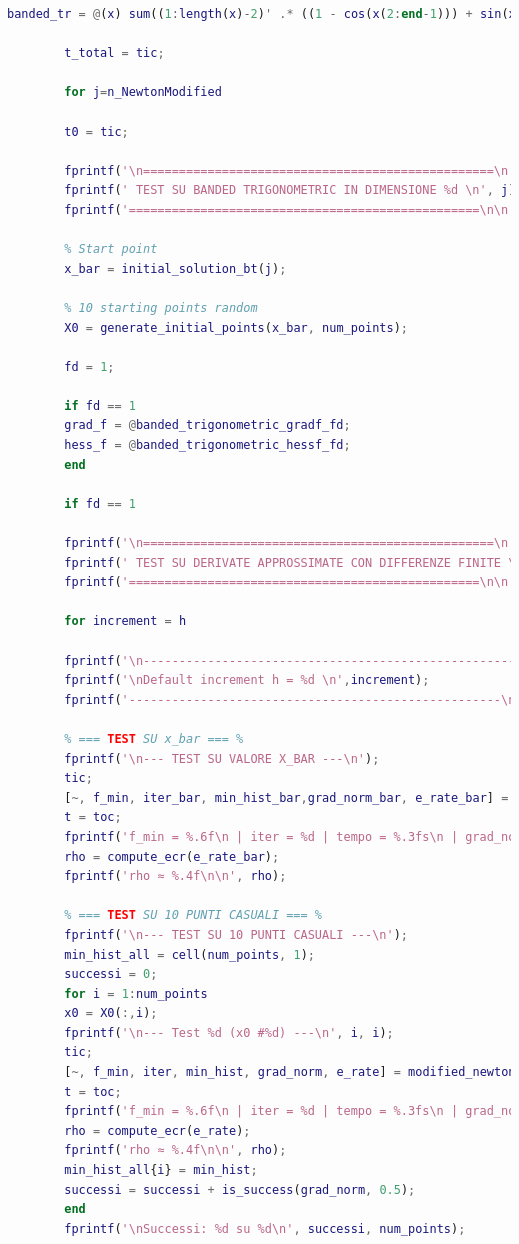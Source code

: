 \documentclass[a4paper,12pt]{article}
\begin{document}
\begin{lstlisting}[language=Matlab,caption={Full script: Modified Newton method on Banded Trigonometric},label={lst:rosenbrock-extended}]
		banded_tr = @(x) sum((1:length(x)-2)' .* ((1 - cos(x(2:end-1))) + sin(x(1:end-2)) - sin(x(3:end))));
		
		t_total = tic;
		
		for j=n_NewtonModified
		
		t0 = tic;
		
		fprintf('\n=================================================\n');
		fprintf(' TEST SU BANDED TRIGONOMETRIC IN DIMENSIONE %d \n', j);
		fprintf('=================================================\n\n');
		
		% Start point
		x_bar = initial_solution_bt(j);
		
		% 10 starting points random
		X0 = generate_initial_points(x_bar, num_points);
		
		fd = 1;
		
		if fd == 1
		grad_f = @banded_trigonometric_gradf_fd;
		hess_f = @banded_trigonometric_hessf_fd;
		end
		
		if fd == 1
		
		fprintf('\n=================================================\n');
		fprintf(' TEST SU DERIVATE APPROSSIMATE CON DIFFERENZE FINITE \n');
		fprintf('=================================================\n\n');
		
		for increment = h
		
		fprintf('\n----------------------------------------------------');
		fprintf('\nDefault increment h = %d \n',increment);
		fprintf('----------------------------------------------------\n');
		
		% === TEST SU x_bar === %
		fprintf('\n--- TEST SU VALORE X_BAR ---\n');
		tic;
		[~, f_min, iter_bar, min_hist_bar,grad_norm_bar, e_rate_bar] = modified_newton(banded_tr,grad_f,hess_f,x_bar,tol,max_iter,fd,increment,0);
		t = toc;
		fprintf('f_min = %.6f\n | iter = %d | tempo = %.3fs\n | grad_norm = %.6f\n', f_min, iter_bar, t, grad_norm_bar);
		rho = compute_ecr(e_rate_bar);
		fprintf('rho ≈ %.4f\n\n', rho);
		
		% === TEST SU 10 PUNTI CASUALI === %
		fprintf('\n--- TEST SU 10 PUNTI CASUALI ---\n');
		min_hist_all = cell(num_points, 1);
		successi = 0;
		for i = 1:num_points
		x0 = X0(:,i);
		fprintf('\n--- Test %d (x0 #%d) ---\n', i, i);
		tic;
		[~, f_min, iter, min_hist, grad_norm, e_rate] = modified_newton(banded_tr,grad_f,hess_f,x0,tol,max_iter,fd,increment,0);
		t = toc;
		fprintf('f_min = %.6f\n | iter = %d | tempo = %.3fs\n | grad_norm = %.6f\n', f_min, iter, t, grad_norm);
		rho = compute_ecr(e_rate);
		fprintf('rho ≈ %.4f\n\n', rho);
		min_hist_all{i} = min_hist;
		successi = successi + is_success(grad_norm, 0.5);
		end
		fprintf('\nSuccessi: %d su %d\n', successi, num_points);
		

\end{lstlisting}
\end{document}

